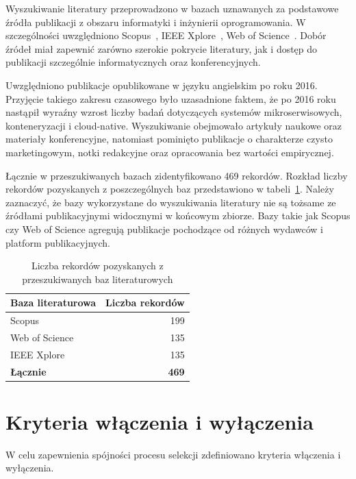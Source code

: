 Wyszukiwanie literatury przeprowadzono w bazach uznawanych za podstawowe źródła publikacji z obszaru informatyki i inżynierii oprogramowania. W szczególności uwzględniono Scopus~\cite{scopus}, IEEE Xplore~\cite{ieeexplore}, Web of Science~\cite{webofscience}. Dobór źródeł miał zapewnić zarówno szerokie pokrycie literatury, jak i dostęp do publikacji szczególnie informatycznych oraz konferencyjnych.

Uwzględniono publikacje opublikowane w języku angielskim po roku 2016. Przyjęcie takiego zakresu czasowego było uzasadnione faktem, że po 2016 roku nastąpił wyraźny wzrost liczby badań dotyczących systemów mikroserwisowych, konteneryzacji i cloud-native. Wyszukiwanie obejmowało artykuły naukowe oraz materiały konferencyjne, natomiast pominięto publikacje o charakterze czysto marketingowym, notki redakcyjne oraz opracowania bez wartości empirycznej.

Łącznie w przeszukiwanych bazach zidentyfikowano 469 rekordów. Rozkład liczby rekordów pozyskanych z poszczególnych baz przedstawiono w tabeli~\ref{tab:slr-databases}. Należy zaznaczyć, że bazy wykorzystane do wyszukiwania literatury nie są tożsame ze źródłami publikacyjnymi widocznymi w końcowym zbiorze. Bazy takie jak Scopus czy Web of Science agregują publikacje pochodzące od różnych wydawców i platform publikacyjnych.

\begin{table}[htbp]
    \centering
    \caption{Liczba rekordów pozyskanych z przeszukiwanych baz literaturowych}
    \label{tab:slr-databases}
    \begin{tabular}{|l|r|}
        \hline
        \textbf{Baza literaturowa} & \textbf{Liczba rekordów} \\
        \hline
        Scopus & 199 \\
        Web of Science & 135 \\
        IEEE Xplore & 135 \\
        \hline
        \textbf{Łącznie} & \textbf{469} \\
        \hline
    \end{tabular}
\end{table}

\section{Kryteria włączenia i wyłączenia}

W celu zapewnienia spójności procesu selekcji zdefiniowano kryteria włączenia i wyłączenia.

